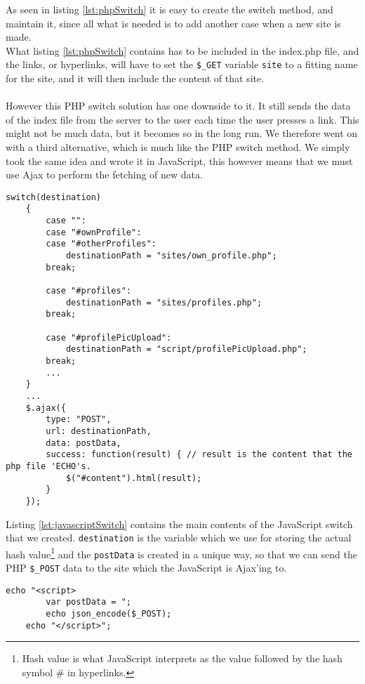 As seen in listing \ref{lst:phpSwitch} it is easy to create the switch method, and maintain it, since all what is needed is to add another case when a new site is made.\\
What listing \ref{lst:phpSwitch} contains has to be included in the index.php file, and the links, or hyperlinks, will have to set the \texttt{\$\_GET} variable \texttt{site} to a fitting name for the site, and it will then include the content of that site.\\
\\
However this PHP switch solution has one downside to it. It still sends the data of the index file from the server to the user each time the user presses a link. This might not be much data, but it becomes so in the long run. We therefore went on with a third alternative, which is much like the PHP switch method. We simply took the same idea and wrote it in JavaScript, this however means that we must use Ajax to perform the fetching of new data.\\
\lstset{language=Java}
\begin{lstlisting}[firstline=1,caption={The JavaScript switch},label=lst:javascriptSwitch]
switch(destination)
	{
		case "":
		case "#ownProfile":
		case "#otherProfiles":
			destinationPath = "sites/own_profile.php";
		break;
		
		case "#profiles":
			destinationPath = "sites/profiles.php";
		break;
		
		case "#profilePicUpload":
			destinationPath = "script/profilePicUpload.php";
		break;
		...
	}
	...
	$.ajax({
		type: "POST",
		url: destinationPath,
		data: postData,
		success: function(result) { // result is the content that the php file 'ECHO's.
			$("#content").html(result);
		}
	});
\end{lstlisting}

Listing \ref{lst:javascriptSwitch} contains the main contents of the JavaScript switch that we created. \texttt{destination} is the variable which we use for storing the actual hash value\footnote{Hash value is what JavaScript interprets as the value followed by the hash symbol \# in hyperlinks.} and the \texttt{postData} is created in a unique way, so that we can send the PHP \texttt{\$\_POST} data to the site which the JavaScript is Ajax'ing to.\\
\lstset{language=PHP}
\begin{lstlisting}[firstline=1,caption={The POST transform code},label=lst:postTransform]
	echo "<script>
		var postData = ";
		echo json_encode($_POST);
	echo "</script>";
\end{lstlisting}

